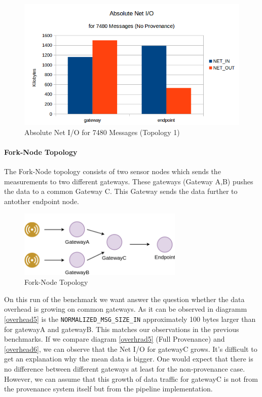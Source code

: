 \begin{figure}[H]
	\center
	\includegraphics[width=\textwidth]{figures/overheaddiagram8.png}
	\caption{Absolute Net I/O for 7480 Messages (Topology 1)}
	\label{fig:topo1absolutewithouotprov}
\end{figure}



\paragraph*{Fork-Node Topology}
The Fork-Node topology consists of two sensor nodes which sends the measurements to two different gateways. These gateways (Gateway A,B) pushes the data to a common Gateway C. This Gateway sends the data further to antother endpoint node.

\begin{figure}[H]
	\center
	\includegraphics[width=0.7\textwidth]{figures/dataoverheadtopolabeled2.png}
	\caption{Fork-Node Topology}
	\label{fig:deployment}
\end{figure}


On this run of the benchmark we want answer the question whether the data overhead is growing on common gateways. As it can be observed in diagramm \ref{overhead5} is the \texttt{NORMALIZED\_MSG\_SIZE\_IN} approximately 100 bytes larger than for gatewayA and gatewayB. This matches our observations in the previous benchmarks.
If we compare diagram \ref{overhrad5} (Full Provenance) and  \ref{overhead6}, we can observe that the Net I/O for gatewayC grows. It's difficult to get an explanation why the mean data is bigger. One would expect that there is no difference between different gateways at least for the non-provenance case.
However, we can assume that this growth of data traffic for gatewayC is not from the provenance system itself but from the pipeline implementation.


